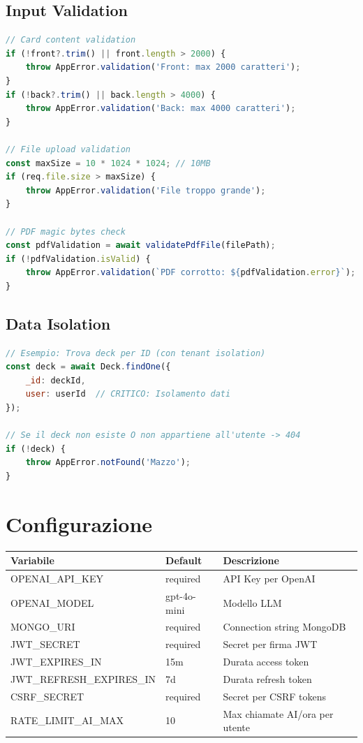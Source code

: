 \documentclass[11pt,a4paper]{article}
\begin{document}
\subsection{Input Validation}

\begin{lstlisting}[language=JavaScript]
// Card content validation
if (!front?.trim() || front.length > 2000) {
    throw AppError.validation('Front: max 2000 caratteri');
}
if (!back?.trim() || back.length > 4000) {
    throw AppError.validation('Back: max 4000 caratteri');
}

// File upload validation
const maxSize = 10 * 1024 * 1024; // 10MB
if (req.file.size > maxSize) {
    throw AppError.validation('File troppo grande');
}

// PDF magic bytes check
const pdfValidation = await validatePdfFile(filePath);
if (!pdfValidation.isValid) {
    throw AppError.validation(`PDF corrotto: ${pdfValidation.error}`);
}
\end{lstlisting}

\subsection{Data Isolation}

\begin{lstlisting}[language=JavaScript]
// Esempio: Trova deck per ID (con tenant isolation)
const deck = await Deck.findOne({ 
    _id: deckId, 
    user: userId  // CRITICO: Isolamento dati
});

// Se il deck non esiste O non appartiene all'utente -> 404
if (!deck) {
    throw AppError.notFound('Mazzo');
}
\end{lstlisting}

\section{Configurazione}\label{sec:config}

\begin{longtable}{|p{4.5cm}|p{2.5cm}|p{7cm}|}
\hline
\textbf{Variabile} & \textbf{Default} & \textbf{Descrizione} \\
\hline
\endfirsthead
OPENAI\_API\_KEY & required & API Key per OpenAI \\
\hline
OPENAI\_MODEL & gpt-4o-mini & Modello LLM \\
\hline
MONGO\_URI & required & Connection string MongoDB \\
\hline
JWT\_SECRET & required & Secret per firma JWT \\
\hline
JWT\_EXPIRES\_IN & 15m & Durata access token \\
\hline
JWT\_REFRESH\_EXPIRES\_IN & 7d & Durata refresh token \\
\hline
CSRF\_SECRET & required & Secret per CSRF tokens \\
\hline
RATE\_LIMIT\_AI\_MAX & 10 & Max chiamate AI/ora per utente \\
\hline
\end{longtable}
\end{document}
